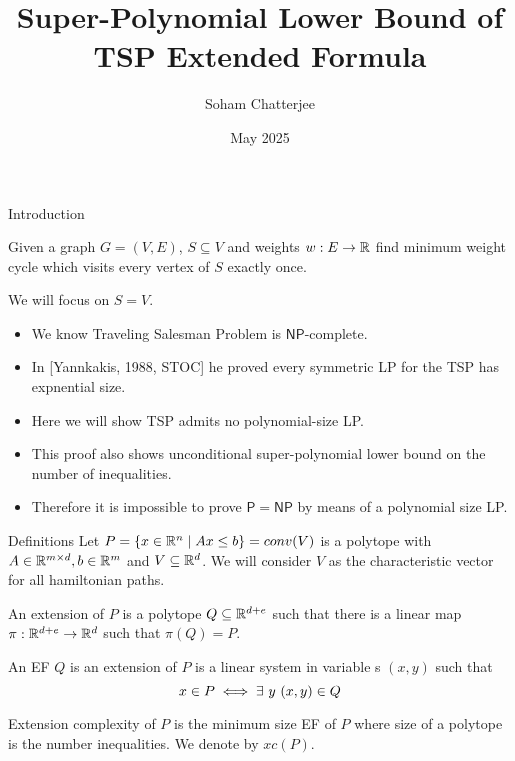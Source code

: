 \documentclass[aspectratio=1610]{beamer}
\title{Super-Polynomial Lower Bound of TSP Extended Formula}
\date{May 2025}
\author{Soham Chatterjee}
\renewcommand{\P}{\ensuremath{\mathsf{P}}}
\newcommand{\NP}{\ensuremath{\mathsf{NP}}}
\begin{document}
\begin{frame}
	\titlepage
\end{frame}


\begin{frame}{Introduction}
	\begin{definition}
		Given a graph $G=(V,E)$, $S\subseteq V$ and weights $w:E\to \mathbb{R}$ find minimum weight cycle which visits every vertex of $S$ exactly once.
	\end{definition}\pause

	We will focus on $S=V$. 
	\begin{itemize}
        \item We know Traveling Salesman Problem is $\NP$-complete. 
        \item In [Yannkakis, 1988, STOC] he proved every symmetric LP for the TSP has expnential size.
        \item Here we will show TSP admits no polynomial-size LP.
        \item This proof also shows unconditional super-polynomial lower bound on the number of inequalities.
        \item Therefore it is impossible to prove $\P=\NP$ by means of a polynomial size LP.
    \end{itemize}
\end{frame}
\begin{frame}{Definitions}
	Let $P=\{x\in\mathbb{R}^n\mid Ax\leq b\}=conv(V)$ is a polytope  with $A\in\mathbb{R}^{m\times d}, b\in \mathbb{R}^m$ and $V\subseteq \mathbb{R}^d$. We will consider $V$ as the characteristic vector for all hamiltonian paths.\pause

	\begin{definition}
		An extension of $P$ is a polytope $Q\subseteq \mathbb{R}^{d+e}$ such that there is a linear map $\pi:\mathbb{R}^{d+e}\to\mathbb{R}^{d}$ such that $\pi(Q)=P$.
	\end{definition}\pause

	\begin{definition}
			An EF $Q$ is an extension of $P$ is a linear system in variable s $(x,y)$ such that $$x\in P\iff \exists\ y\ (x,y)\in Q$$\pause

			Extension complexity of $P$ is the minimum size  EF of $P$ where size of a polytope is the number inequalities. We denote by $xc(P)$.
	\end{definition}
\end{frame}
\end{document}
